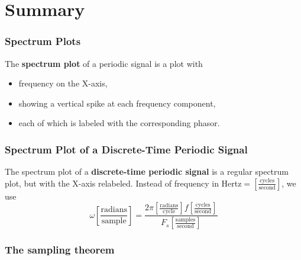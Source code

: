 \documentclass{beamer}
\begin{document}
\section[Summary]{Summary}
\setcounter{subsection}{1}

\begin{frame}
  \frametitle{Spectrum Plots}

  The {\bf spectrum plot} of a periodic signal is a plot with
  \begin{itemize}
  \item frequency on the X-axis,
  \item showing a vertical spike at each frequency component,
  \item each of which is labeled with the corresponding phasor.
  \end{itemize}
\end{frame}

\begin{frame}
  \frametitle{Spectrum Plot of a Discrete-Time Periodic Signal}

  The spectrum plot of a {\bf discrete-time periodic signal} is a
  regular spectrum plot, but with the X-axis relabeled.  Instead of
  frequency in Hertz$=\left[\frac{\mbox{cycles}}{\mbox{second}}\right]$, we use
    \begin{displaymath}
      \omega \left[\frac{\mbox{radians}}{\mbox{sample}}\right] =
      \frac{2\pi \left[\frac{\mbox{radians}}{\mbox{cycle}}\right]f\left[\frac{\mbox{cycles}}{\mbox{second}}\right]}{F_s\left[\frac{\mbox{samples}}{\mbox{second}}\right]}
    \end{displaymath}
\end{frame}

\begin{frame}
  \frametitle{The sampling theorem}

\end{frame}
\end{document}
